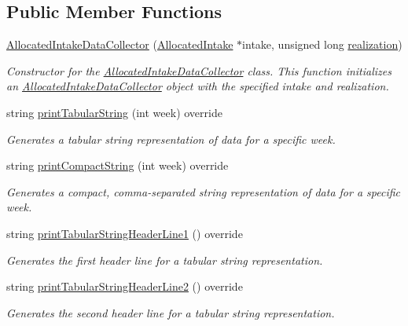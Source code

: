 \subsection*{Public Member Functions}
\begin{DoxyCompactItemize}
\item 
\mbox{\hyperlink{classAllocatedIntakeDataCollector_a9b8eb277ad491771e9c2634c6fd3e11c}{Allocated\+Intake\+Data\+Collector}} (\mbox{\hyperlink{classAllocatedIntake}{Allocated\+Intake}} $\ast$intake, unsigned long \mbox{\hyperlink{classDataCollector_a9ef2887466fe3123aa19ef956a219b96}{realization}})
\begin{DoxyCompactList}\small\item\em Constructor for the \mbox{\hyperlink{classAllocatedIntakeDataCollector}{Allocated\+Intake\+Data\+Collector}} class. This function initializes an \mbox{\hyperlink{classAllocatedIntakeDataCollector}{Allocated\+Intake\+Data\+Collector}} object with the specified intake and realization. \end{DoxyCompactList}\item 
string \mbox{\hyperlink{classAllocatedIntakeDataCollector_a8568c28b643b9a9199e2b91ae5ebbe83}{print\+Tabular\+String}} (int week) override
\begin{DoxyCompactList}\small\item\em Generates a tabular string representation of data for a specific week. \end{DoxyCompactList}\item 
string \mbox{\hyperlink{classAllocatedIntakeDataCollector_aeadb39cfe7fc84264e3bb83ed26b0621}{print\+Compact\+String}} (int week) override
\begin{DoxyCompactList}\small\item\em Generates a compact, comma-\/separated string representation of data for a specific week. \end{DoxyCompactList}\item 
string \mbox{\hyperlink{classAllocatedIntakeDataCollector_ab4149a988e728ce54f89058f8f18dd18}{print\+Tabular\+String\+Header\+Line1}} () override
\begin{DoxyCompactList}\small\item\em Generates the first header line for a tabular string representation. \end{DoxyCompactList}\item 
string \mbox{\hyperlink{classAllocatedIntakeDataCollector_aeee44be0f105fb0d5feac72f4c80f7ff}{print\+Tabular\+String\+Header\+Line2}} () override
\begin{DoxyCompactList}\small\item\em Generates the second header line for a tabular string representation. \end{DoxyCompactList}\item 

\end{DoxyCompactItemize}
